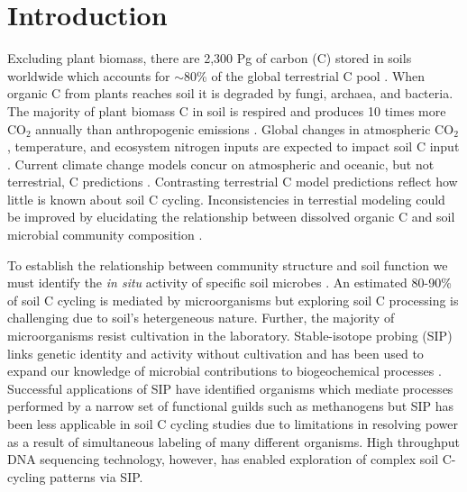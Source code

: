 \section{Introduction}
Excluding plant biomass, there are 2,300 Pg of carbon (C) stored in soils
worldwide which accounts for $\sim$80\% of the global terrestrial C pool
\citep{Amundson_2001,BATJES_1996}. When organic C from plants reaches soil it
is degraded by fungi, archaea, and bacteria.  The majority of plant biomass
C in soil is respired and produces 10 times more CO$_{2}$ annually than
anthropogenic emissions \citep{chapin2002principles}. Global
changes in atmospheric CO$_{2}$, temperature, and ecosystem nitrogen inputs are
expected to impact soil C input \citep{Groenigen_2006}. Current climate change
models concur on atmospheric and oceanic, but not terrestrial, C predictions
\citep{Friedlingstein_2006}. Contrasting terrestrial C model predictions
reflect how little is known about soil C cycling. Inconsistencies in
terrestial modeling could be improved by elucidating the relationship between
dissolved organic C and soil microbial community composition \citep{Neff_2001}.

To establish the relationship between community structure and soil function we
must identify the \textit{in situ} activity of specific soil microbes 
\citep{O_Donnell_2002}. An estimated 80-90\% of soil C cycling is
mediated by microorganisms \citep{ColemanCrossley_1996,Nannipieri_2003} but
exploring soil C processing is challenging due to soil's hetergeneous nature.
Further, the majority of microorganisms resist cultivation in the laboratory.
Stable-isotope probing (SIP) links genetic identity and activity without
cultivation and has been used to expand our knowledge of microbial
contributions to biogeochemical processes \citep{Chen_Murrell_2010}. Successful
applications of SIP have identified organisms which mediate processes performed
by a narrow set of functional guilds such as methanogens \citep{Lu_2005} but
SIP has been less applicable in soil C cycling studies due to limitations in
resolving power as a result of simultaneous labeling of many different
organisms. High throughput DNA sequencing technology, however, has enabled
exploration of complex soil C-cycling patterns via SIP.

